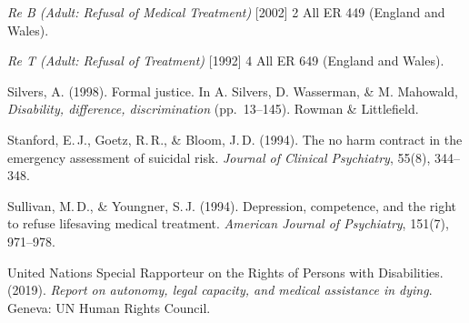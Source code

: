 \documentclass[11pt, letterpaper]{article}
\begin{document}
\textit{Re B (Adult: Refusal of Medical Treatment)} [2002] 2 All ER 449 (England and Wales).

\textit{Re T (Adult: Refusal of Treatment)} [1992] 4 All ER 649 (England and Wales).

Silvers, A. (1998). Formal justice. In A. Silvers, D. Wasserman, \& M. Mahowald,
\textit{Disability, difference, discrimination} (pp.\ 13--145). Rowman \& Littlefield.

Stanford, E.\,J., Goetz, R.\,R., \& Bloom, J.\,D. (1994). The no harm contract in the
emergency assessment of suicidal risk. \textit{Journal of Clinical Psychiatry},
55(8), 344--348.

Sullivan, M.\,D., \& Youngner, S.\,J. (1994). Depression, competence, and the right to
refuse lifesaving medical treatment. \textit{American Journal of Psychiatry},
151(7), 971--978.

United Nations Special Rapporteur on the Rights of Persons with Disabilities. (2019).
\textit{Report on autonomy, legal capacity, and medical assistance in dying}.
Geneva: UN Human Rights Council.
\end{document}
